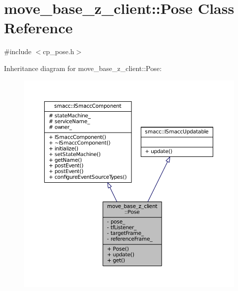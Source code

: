 \hypertarget{classmove__base__z__client_1_1Pose}{}\section{move\+\_\+base\+\_\+z\+\_\+client\+:\+:Pose Class Reference}
\label{classmove__base__z__client_1_1Pose}


{\ttfamily \#include $<$cp\+\_\+pose.\+h$>$}



Inheritance diagram for move\+\_\+base\+\_\+z\+\_\+client\+:\+:Pose\+:
\nopagebreak
\begin{figure}[H]
\begin{center}
\leavevmode
\includegraphics[width=350pt]{classmove__base__z__client_1_1Pose__inherit__graph}
\end{center}
\end{figure}


